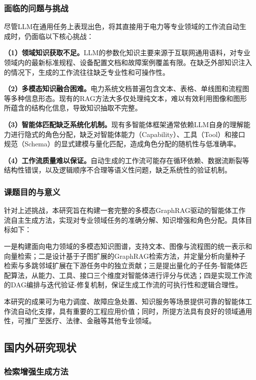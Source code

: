 \subsubsection{面临的问题与挑战}

尽管LLM在通用任务上表现出色，将其直接用于电力等专业领域的工作流自动生成时，仍面临以下核心挑战：

\textbf{（1）领域知识获取不足。}LLM的参数化知识主要来源于互联网通用语料，对专业领域内的最新标准规程、设备配置文档和故障案例覆盖有限。在缺乏外部知识注入的情况下，生成的工作流往往缺乏专业性和可操作性。

\textbf{（2）多模态知识融合困难。}电力系统文档普遍包含文本、表格、单线图和流程图等多种信息形态。现有的RAG方法大多仅处理纯文本，难以有效利用图像和图形所蕴含的结构化信息，导致知识抽取不完整。

\textbf{（3）智能体匹配缺乏系统化机制。}现有多智能体框架通常依赖LLM自身的理解能力进行隐式的角色分配，缺乏对智能体能力（Capability）、工具（Tool）和接口规范（Schema）的显式建模与量化匹配，造成角色分配的随机性与低准确率。

\textbf{（4）工作流质量难以保证。}自动生成的工作流可能存在循环依赖、数据流断裂等结构性错误，以及逻辑顺序不合理等语义性问题，缺乏系统性的验证机制。

\subsubsection{课题目的与意义}

针对上述挑战，本研究旨在构建一套完整的多模态GraphRAG驱动的智能体工作流自主生成方法，实现对专业领域任务的准确分解、知识增强和角色分配。具体目标如下：

一是构建面向电力领域的多模态知识图谱，支持文本、图像与流程图的统一表示和向量检索；二是设计基于子图扩展的GraphRAG检索方法，并定量分析向量种子检索与多跳邻域扩展在下游任务中的独立贡献；三是提出量化的子任务-智能体匹配算法，从能力、工具、接口三个维度对智能体进行评分与优选；四是实现工作流的DAG编排与迭代验证-修复机制，保证生成工作流的可执行性和逻辑合理性。

本研究的成果可为电力调度、故障应急处置、知识服务等场景提供可靠的智能体工作流自动化支撑，具有重要的工程应用价值；同时，所提方法具有良好的领域通用性，可推广至医疗、法律、金融等其他专业领域。

\subsection{国内外研究现状}

\subsubsection{检索增强生成方法}


